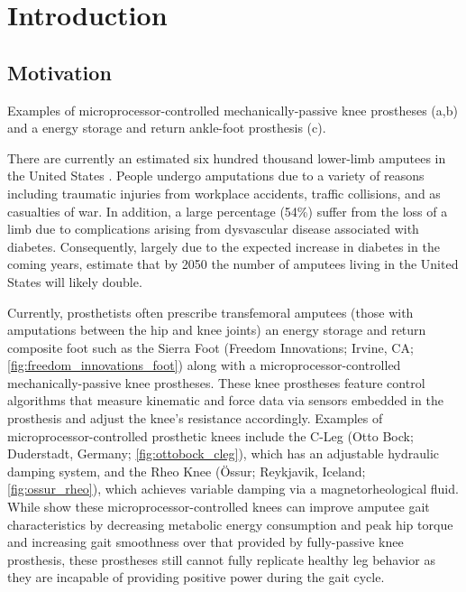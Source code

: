 \chapter{Introduction}

\section{Motivation}
\begin{marginfigure}[0.8in]
    \centering


    \caption{Examples of microprocessor-controlled mechanically-passive knee
    prostheses (a,b) and a energy storage and return ankle-foot prosthesis (c).}
\end{marginfigure}
There are currently an estimated six hundred thousand lower-limb amputees in the
United States \citep{ziegler2008estimating}. People undergo amputations due to a
variety of reasons including traumatic injuries from workplace accidents,
traffic collisions, and as casualties of war. In addition, a large percentage
(54\%) suffer from the loss of a limb due to complications arising from
dysvascular disease associated with diabetes.  Consequently, largely due to the
expected increase in diabetes in the coming years,
\citet{ziegler2008estimating} estimate that by 2050 the number of amputees
living in the United States will likely double.

Currently, prosthetists often prescribe transfemoral amputees (those with
amputations between the hip and knee joints) an energy storage and return
composite foot such as the Sierra Foot (Freedom Innovations; Irvine, CA;
\cref{fig:freedom_innovations_foot}) along with a microprocessor-controlled
mechanically-passive knee prostheses. These knee prostheses feature control
algorithms that measure kinematic and force data via sensors embedded in the
prosthesis and adjust the knee's resistance accordingly.  Examples of
microprocessor-controlled prosthetic knees include the C-Leg (Otto Bock;
Duderstadt, Germany; \cref{fig:ottobock_cleg}), which has an adjustable
hydraulic damping system, and the Rheo Knee (Össur; Reykjavik, Iceland;
\cref{fig:ossur_rheo}), which achieves variable damping via a magnetorheological
fluid. While \citet{johansson2005clinical} show these microprocessor-controlled
knees can improve amputee gait characteristics by decreasing metabolic energy
consumption and peak hip torque and increasing gait smoothness over that
provided by fully-passive knee prosthesis, these prostheses still cannot fully
replicate healthy leg behavior as they are incapable of providing positive power
during the gait cycle. 

